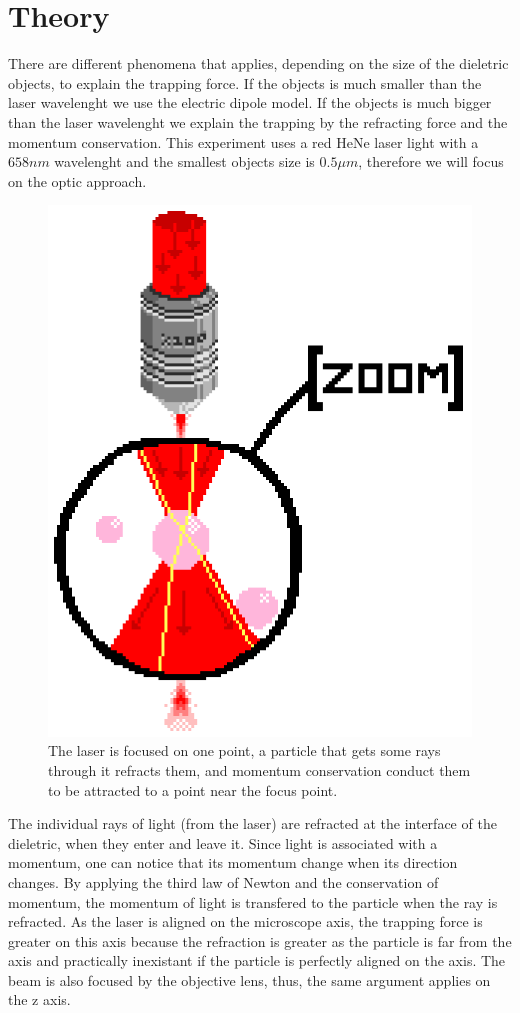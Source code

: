 \documentclass[a4paper,12pt,twoside]{article}	%
\begin{document}
\section{Theory}
There are different phenomena that applies, depending on the size of the dieletric objects, to explain the trapping force.
If the objects is much smaller than the laser wavelenght we use the electric dipole model.
If the objects is much bigger than the laser wavelenght we explain the trapping by the refracting force and the momentum conservation.
This experiment uses a red HeNe laser light with a $658 nm$ wavelenght and the smallest objects size is $0.5\mu m$,
therefore we will focus on the optic approach.
\begin{figure}[h!]
	\begin{center}
	\includegraphics[width=0.5\linewidth,angle=0]{./figures/lazor_zoom}
	\caption{The laser is focused on one point, a particle that gets some rays through it refracts them, and momentum conservation conduct them to be attracted to a point near the focus point.} \label{fig:theory}
	\end{center}
\end{figure}


The individual rays of light (from the laser) are refracted at the interface of the dieletric, when they enter and leave it.
Since light is associated with a momentum, one can notice that its momentum change when its direction changes.
By applying the third law of Newton and the conservation of momentum, the momentum of light is transfered to the particle when the ray is refracted.
As the laser is aligned on the microscope axis, the trapping force is greater on this axis because
 the refraction is greater as the particle is far from the axis and practically inexistant if the particle is perfectly aligned on the axis.
The beam is also focused by the objective lens, thus, the same argument applies on the z axis.
\end{document}
